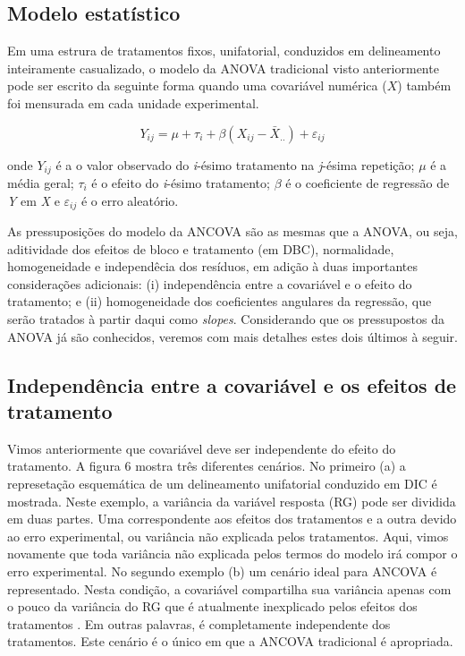 \documentclass[
]{book}
\begin{document}
\hypertarget{modelo-estatuxedstico-1}{%
\subsection{Modelo estatístico}\label{modelo-estatuxedstico-1}}

Em uma estrura de tratamentos fixos, unifatorial, conduzidos em delineamento inteiramente casualizado, o modelo da ANOVA tradicional visto anteriormente pode ser escrito da seguinte forma quando uma covariável numérica (\(X\)) também foi mensurada em cada unidade experimental.

\[
Y_{ij} = \mu + \tau_i + \beta(X_{ij} - \bar X_{..}) + \varepsilon_{ij}
\]

onde \(Y_{ij}\) é a o valor observado do \emph{i}-ésimo tratamento na \emph{j}-ésima repetição; \(\mu\) é a média geral; \(\tau_i\) é o efeito do \emph{i}-ésimo tratamento; \(\beta\) é o coeficiente de regressão de \emph{Y} em \emph{X} e \(\varepsilon_{ij}\) é o erro aleatório.

As pressuposições do modelo da ANCOVA são as mesmas que a ANOVA, ou seja, aditividade dos efeitos de bloco e tratamento (em DBC), normalidade, homogeneidade e independêcia dos resíduos, em adição à duas importantes considerações adicionais: (i) independência entre a covariável e o efeito do tratamento; e (ii) homogeneidade dos coeficientes angulares da regressão, que serão tratados à partir daqui como \emph{slopes}. Considerando que os pressupostos da ANOVA já são conhecidos, veremos com mais detalhes estes dois últimos à seguir.

\hypertarget{independuxeancia-entre-a-covariuxe1vel-e-os-efeitos-de-tratamento}{%
\subsection{Independência entre a covariável e os efeitos de tratamento}\label{independuxeancia-entre-a-covariuxe1vel-e-os-efeitos-de-tratamento}}

Vimos anteriormente que covariável deve ser independente do efeito do tratamento. A figura 6 mostra três diferentes cenários. No primeiro (a) a represetação esquemática de um delineamento unifatorial conduzido em DIC é mostrada. Neste exemplo, a variância da variável resposta (RG) pode ser dividida em duas partes. Uma correspondente aos efeitos dos tratamentos e a outra devido ao erro experimental, ou variância não explicada pelos tratamentos. Aqui, vimos novamente que toda variância não explicada pelos termos do modelo irá compor o erro experimental. No segundo exemplo (b) um cenário ideal para ANCOVA é representado. Nesta condição, a covariável compartilha sua variância apenas com o pouco da variância do RG que é atualmente inexplicado pelos efeitos dos tratamentos . Em outras palavras, é completamente independente dos tratamentos. Este cenário é o único em que a ANCOVA tradicional é apropriada.
\end{document}
